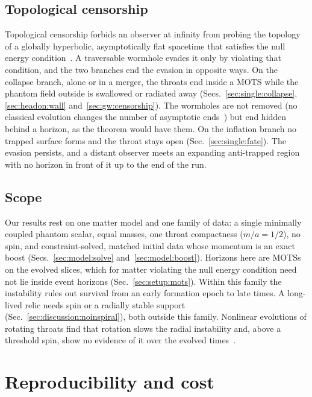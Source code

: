 \documentclass[twocolumn,floatfix,aps,prd,superscriptaddress,nofootinbib]{revtex4-2}
\begin{document}
\subsection{Topological censorship}
\label{sec:discussion:topology}

Topological censorship forbids an observer at infinity from probing the topology of a globally hyperbolic, asymptotically flat spacetime that satisfies the null energy condition~\cite{friedman1993}. A traversable wormhole evades it only by violating that condition, and the two branches end the evasion in opposite ways. On the collapse branch, alone or in a merger, the throats end inside a MOTS while the phantom field outside is swallowed or radiated away (Secs.~\ref{sec:single:collapse}, \ref{sec:headon:wall} and~\ref{sec:gw:censorship}). The wormholes are not removed (no classical evolution changes the number of asymptotic ends~\cite{geroch1967}) but end hidden behind a horizon, as the theorem would have them. On the inflation branch no trapped surface forms and the throat stays open (Sec.~\ref{sec:single:fate}). The evasion persists, and a distant observer meets an expanding anti-trapped region with no horizon in front of it up to the end of the run.

\subsection{Scope}
\label{sec:discussion:open}

Our results rest on one matter model and one family of data: a single minimally coupled phantom scalar, equal masses, one throat compactness ($m/a=1/2$), no spin, and constraint-solved, matched initial data whose momentum is an exact boost (Secs.~\ref{sec:model:solve} and~\ref{sec:model:boost}). Horizons here are MOTSs on the evolved slices, which for matter violating the null energy condition need not lie inside event horizons (Sec.~\ref{sec:setup:mots}). Within this family the instability rules out survival from an early formation epoch to late times. A long-lived relic needs spin or a radially stable support (Sec.~\ref{sec:discussion:noinspiral}), both outside this family. Nonlinear evolutions of rotating throats find that rotation slows the radial instability and, above a threshold spin, show no evidence of it over the evolved times~\cite{shirokov2026c}.

\section{Reproducibility and cost}
\label{sec:repro}
\label{sec:cost}
\end{document}
